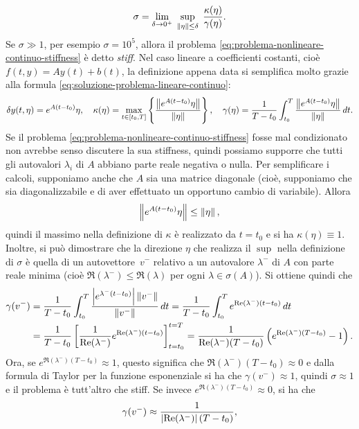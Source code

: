 \begin{equation} \label{eq:definizione-rapporto-di-stiffness}
\sigma = \lim_{\delta \to 0^+} \; \sup_{\left\lVert\eta\right\rVert \leq \delta} \;
	\frac{\kappa(\eta)}{\gamma(\eta)}.
\end{equation}
Se $\sigma \gg 1$, per esempio $\sigma = 10^5$, allora il problema
\eqref{eq:problema-nonlineare-continuo-stiffness} è detto \emph{stiff}.
Nel caso lineare a coefficienti costanti, cioè $f(t,y) = Ay(t) + b(t)$,
la definizione appena data si semplifica molto grazie alla formula
\eqref{eq:soluzione-problema-lineare-continuo}:
\[
\delta y(t,\eta) = e^{A(t-t_0)} \eta, \quad
\kappa(\eta) = \max_{t \in [t_0,T]} \left\lbrace
	\frac{\left\lVert e^{A(t-t_0)} \eta\right\rVert}{\left\lVert\eta\right\rVert} \right\rbrace, \quad
\gamma(\eta) = \frac{1}{T-t_0} \int_{t_0}^T
	\frac{\left\lVert e^{A(t-t_0)} \eta\right\rVert}{\left\lVert\eta\right\rVert} \, dt.
\]
Se il problema \eqref{eq:problema-nonlineare-continuo-stiffness} fosse
mal condizionato non avrebbe senso discutere la sua stiffness, quindi
possiamo supporre che tutti gli autovalori $\lambda_i$ di $A$ abbiano
parte reale negativa o nulla. Per semplificare i calcoli, supponiamo
anche che $A$ sia una matrice diagonale (cioè, supponiamo che sia
diagonalizzabile e di aver effettuato un opportuno cambio di variabile). Allora
\[
\left\lVert e^{A(t-t_0)} \eta\right\rVert \leq \left\lVert\eta\right\rVert,
\]
quindi il massimo nella definizione di $\kappa$ è realizzato da $t = t_0$
e si ha $\kappa(\eta) \equiv 1$.
Inoltre, si può dimostrare che la direzione $\eta$ che realizza il $\sup$ nella
definizione di $\sigma$ è quella di un autovettore~$v^-$ relativo a un
autovalore $\lambda^-$ di $A$ con parte reale minima
(cioè $\Re(\lambda^-) \leq \Re(\lambda)$ per ogni $\lambda \in \sigma(A)$).
Si ottiene quindi che
\begin{align*}
\gamma(v^-)
&= \frac{1}{T-t_0} \int_{t_0}^T \frac{\left\lvert e^{\lambda^-(t-t_0)}\right\rvert \left\lVert v^-\right\rVert}{\left\lVert v^-\right\rVert} \, dt
 = \frac{1}{T-t_0} \int_{t_0}^T e^{\operatorname{Re}(\lambda^-)(t-t_0)} \, dt \\
&= \frac{1}{T-t_0} \left[ \frac{1}{\operatorname{Re}(\lambda^-)} e^{\operatorname{Re}(\lambda^-)(t-t_0)}
	\right]_{t=t_0}^{t=T}
 = \frac{1}{\operatorname{Re}(\lambda^-)(T-t_0)} \left( e^{\operatorname{Re}(\lambda^-)(T-t_0)} - 1 \right).
\end{align*}
Ora, se $e^{\Re(\lambda^-)(T-t_0)} \approx 1$, questo significa che
$\Re(\lambda^-)(T-t_0) \approx 0$ e dalla formula di Taylor per la funzione
esponenziale si ha che $\gamma(v^-) \approx 1$,
quindi $\sigma \approx 1$ e il problema è tutt'altro che stiff.
Se invece $e^{\Re(\lambda^-)(T-t_0)} \approx 0$, si ha che
\[
\gamma(v^-) \approx \frac{1}{\left\lvert\operatorname{Re}(\lambda^-)\right\rvert(T-t_0)},
\]
